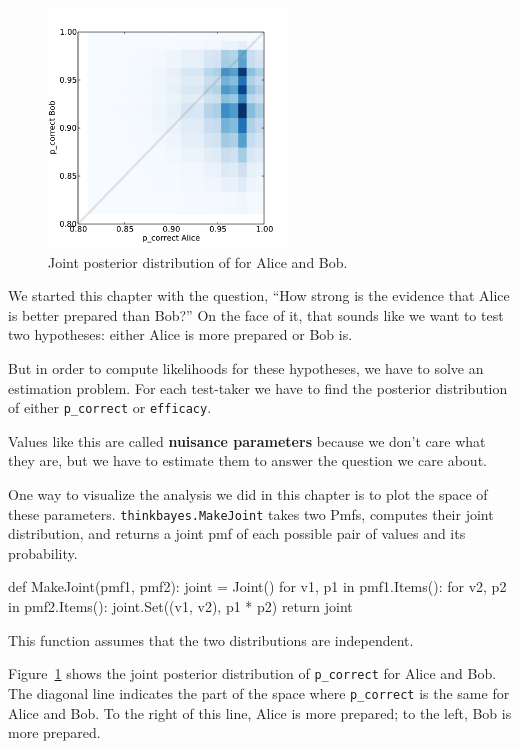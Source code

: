 \documentclass[12pt]{book}
\theoremstyle{exercise}
\begin{document}
\begin{figure}
\centerline{\includegraphics[height=2.5in]{figs/sat_joint.pdf}}
\caption{Joint posterior distribution of  for Alice and Bob.}
\label{fig.satjoint}
\end{figure}

We started this chapter with the question,
``How strong is the evidence that Alice is better prepared
than Bob?''  On the face of it, that sounds like we want to
test two hypotheses: either Alice is more prepared or Bob is.

But in order to compute likelihoods for these hypotheses, we
have to solve an estimation problem.  For each test-taker
we have to find the posterior distribution of either
\verb"p_correct" or \verb"efficacy".

Values like this are called {\bf nuisance parameters} because
we don't care what they are, but we have
to estimate them to answer the question we care about.

One way to visualize the analysis we did in this chapter is
to plot the space of these parameters.  \verb"thinkbayes.MakeJoint"
takes two Pmfs, computes their joint distribution, and returns
a joint pmf of each possible pair of values and its probability.

\begin{code}
def MakeJoint(pmf1, pmf2):
    joint = Joint()
    for v1, p1 in pmf1.Items():
        for v2, p2 in pmf2.Items():
            joint.Set((v1, v2), p1 * p2)
    return joint
\end{code}

This function assumes that the two distributions are independent.

Figure~\ref{fig.satjoint} shows the joint posterior distribution of
\verb"p_correct" for Alice and Bob.  The diagonal line indicates the
part of the space where \verb"p_correct" is the same for Alice and
Bob.  To the right of this line, Alice is more prepared; to the left,
Bob is more prepared.
\end{document}
